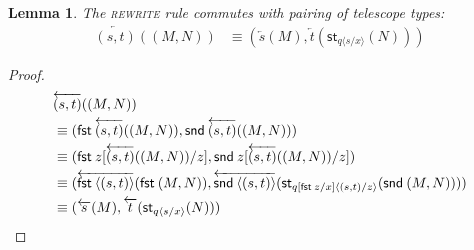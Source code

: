\documentclass[10pt]{article}
\newtheorem{lemma}{Lemma}
\theoremstyle{definition}
\newcommand\dsd[1]{\ensuremath{\mathsf{#1}}}
\newcommand{\app}[2]{\ensuremath{#1 \: #2}}
\newcommand{\fst}[1]{\app{\dsd{fst}}{#1}}
\newcommand{\snd}[1]{\app{\dsd{snd}}{#1}}
\newcommand{\id}{\mathsf{id}}
\newcommand{\rewrite}[2]{\overleftarrow{#1}(#2)}
\newcommand\StI[2]{\ensuremath{\mathsf{st}_{#1}(#2)}}
\newcommand\UnSt[2]{\ensuremath{\mathsf{unst}_{#1}(#2)}}
\newcommand\ap[2]{\ensuremath{#1 \langle #2 \rangle }}
\begin{document}
\begin{lemma}
The \textsc{rewrite} rule commutes with pairing of telescope types:
\begin{align*}
\rewrite{(s, t)}{(M, N)} &\equiv (\rewrite{s}{M}, \rewrite{t}{\StI{\ap{q}{s/x}}{N}} ) 
\end{align*}
\end{lemma}
\begin{proof}
\begin{align*}
&\rewrite{(s, t)}{(M, N)} \\
&\equiv (\fst\rewrite{(s, t)}{(M, N)}, \snd \rewrite{(s, t)}{(M, N)} ) \\
&\equiv (\fst z [\rewrite{(s, t)}{(M, N)}/z], \snd z [\rewrite{(s, t)}{(M, N)}/z] ) \\
&\equiv (\rewrite{\ap{\fst}{(s, t)}}{\fst (M, N)}, \rewrite{\ap{\snd}{(s, t)}}{\StI{\ap{q[\fst z/x]}{(s, t)/z}}{\snd (M, N)}} ) \\
&\equiv (\rewrite{s}{M}, \rewrite{t}{\StI{\ap{q}{s/x}}{N}} )
\end{align*}

\end{proof}
\end{document}
